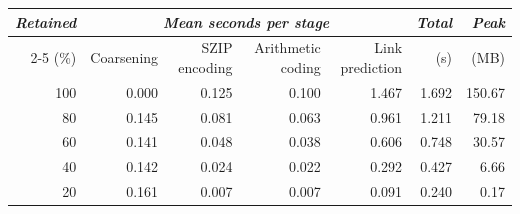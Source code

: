 \begin{tabular}{rrrrrrr}
\toprule
\textit{Retained} & \multicolumn{4}{c}{\textit{Mean seconds per stage}} & \textit{Total} & \textit{Peak} \\
\cmidrule(lr){2-5}
(\%) & Coarsening & SZIP encoding & Arithmetic coding & Link prediction & (s) & (MB) \\
\midrule
100 & 0.000 & 0.125 & 0.100 & 1.467 & 1.692 & 150.67 \\
80 & 0.145 & 0.081 & 0.063 & 0.961 & 1.211 & 79.18 \\
60 & 0.141 & 0.048 & 0.038 & 0.606 & 0.748 & 30.57 \\
40 & 0.142 & 0.024 & 0.022 & 0.292 & 0.427 & 6.66 \\
20 & 0.161 & 0.007 & 0.007 & 0.091 & 0.240 & 0.17 \\
\bottomrule
\end{tabular}
